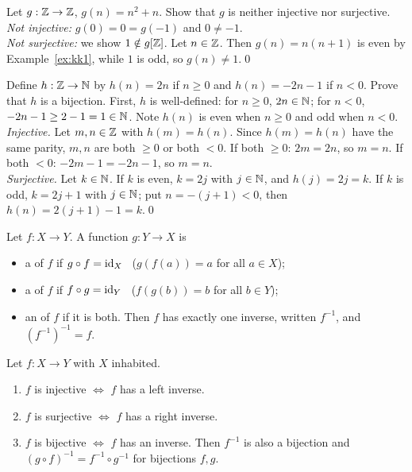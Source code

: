 \begin{hexample}
Let $g:\mathbb{Z}\to\mathbb{Z}$, $g(n)=n^2+n$. Show that $g$ is neither injective nor surjective.
\solution
\emph{Not injective:} $g(0)=0=g(-1)$ and $0\neq-1$.\\
\emph{Not surjective:} we show $1\notin g[\mathbb{Z}]$. Let $n\in\mathbb{Z}$. Then $g(n)=n(n+1)$ is even by Example~\ref{ex:kk1}, while $1$ is odd, so $g(n)\neq1$.\qed
\end{hexample}

\begin{hexample}\label{ex:zigzag}
Define $h:\mathbb{Z}\to\mathbb{N}$ by $h(n)=2n$ if $n\ge0$ and $h(n)=-2n-1$ if $n<0$. Prove that $h$ is a bijection.
\solution
First, $h$ is well-defined: for $n\ge0$, $2n\in\mathbb{N}$; for $n<0$, $-2n-1\ge2-1=1\in\mathbb{N}$. Note $h(n)$ is even when $n\ge0$ and odd when $n<0$.\\
\emph{Injective.} Let $m,n\in\mathbb{Z}$ with $h(m)=h(n)$. Since $h(m)=h(n)$ have the same parity, $m,n$ are both $\ge0$ or both $<0$. If both $\ge0$: $2m=2n$, so $m=n$. If both $<0$: $-2m-1=-2n-1$, so $m=n$.\\
\emph{Surjective.} Let $k\in\mathbb{N}$. If $k$ is even, $k=2j$ with $j\in\mathbb{N}$, and $h(j)=2j=k$. If $k$ is odd, $k=2j+1$ with $j\in\mathbb{N}$; put $n=-(j+1)<0$, then $h(n)=2(j+1)-1=k$.\qed
\end{hexample}

\begin{key}[Inverses]
Let $f:X\to Y$. A function $g:Y\to X$ is
\begin{itemize}
\item a  of $f$ if $g\circ f=\mathrm{id}_X$ \ (\ie $g(f(a))=a$ for all $a\in X$);
\item a  of $f$ if $f\circ g=\mathrm{id}_Y$ \ (\ie $f(g(b))=b$ for all $b\in Y$);
\item an  of $f$ if it is both. Then $f$ has exactly one inverse, written $f^{-1}$, and $(f^{-1})^{-1}=f$.
\end{itemize}
\end{key}

\begin{result}
Let $f:X\to Y$ with $X$ inhabited.
\begin{enumerate}
\item $f$ is injective $\Leftrightarrow$ $f$ has a left inverse.
\item $f$ is surjective $\Leftrightarrow$ $f$ has a right inverse.
\item $f$ is bijective $\Leftrightarrow$ $f$ has an inverse. Then $f^{-1}$ is also a bijection and $(g\circ f)^{-1}=f^{-1}\circ g^{-1}$ for bijections $f,g$.
\end{enumerate}
\end{result}

